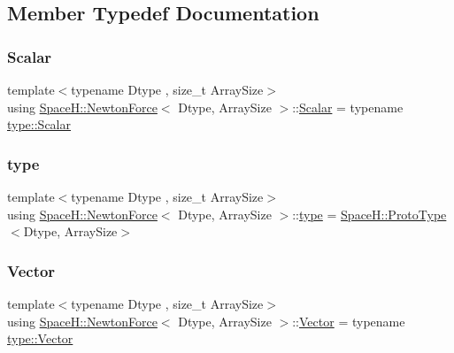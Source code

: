 \subsection{Member Typedef Documentation}
\mbox{\label{struct_space_h_1_1_newton_force_a26afc180e0b2f65fe0a38aedceb9616f}} 
\subsubsection{\texorpdfstring{Scalar}{Scalar}}
{\footnotesize\ttfamily template$<$typename Dtype , size\+\_\+t Array\+Size$>$ \\
using \mbox{\hyperlink{struct_space_h_1_1_newton_force}{Space\+H\+::\+Newton\+Force}}$<$ Dtype, Array\+Size $>$\+::\mbox{\hyperlink{struct_space_h_1_1_newton_force_a26afc180e0b2f65fe0a38aedceb9616f}{Scalar}} =  typename \mbox{\hyperlink{struct_space_h_1_1_proto_type_af3c8245d83d9db64749882920de5c274}{type\+::\+Scalar}}}

\mbox{\label{struct_space_h_1_1_newton_force_a8d8255adf547360365ec990ff39324d6}} 
\subsubsection{\texorpdfstring{type}{type}}
{\footnotesize\ttfamily template$<$typename Dtype , size\+\_\+t Array\+Size$>$ \\
using \mbox{\hyperlink{struct_space_h_1_1_newton_force}{Space\+H\+::\+Newton\+Force}}$<$ Dtype, Array\+Size $>$\+::\mbox{\hyperlink{struct_space_h_1_1_newton_force_a8d8255adf547360365ec990ff39324d6}{type}} =  \mbox{\hyperlink{struct_space_h_1_1_proto_type}{Space\+H\+::\+Proto\+Type}}$<$Dtype, Array\+Size$>$}

\mbox{\label{struct_space_h_1_1_newton_force_aeb07826be31edb8f1bbaef06c66e9565}} 
\subsubsection{\texorpdfstring{Vector}{Vector}}
{\footnotesize\ttfamily template$<$typename Dtype , size\+\_\+t Array\+Size$>$ \\
using \mbox{\hyperlink{struct_space_h_1_1_newton_force}{Space\+H\+::\+Newton\+Force}}$<$ Dtype, Array\+Size $>$\+::\mbox{\hyperlink{struct_space_h_1_1_newton_force_aeb07826be31edb8f1bbaef06c66e9565}{Vector}} =  typename \mbox{\hyperlink{struct_space_h_1_1_proto_type_a316b81f4660b2b4fab14a8e1f23b6089}{type\+::\+Vector}}}



